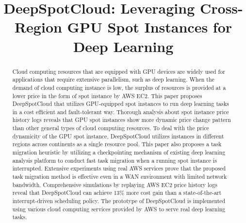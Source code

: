 \documentclass[conference]{IEEEtran}
\begin{document}

\title{DeepSpotCloud: Leveraging Cross-Region GPU Spot Instances for Deep Learning}


\author{
\and
{}
}

\maketitle

\begin{abstract}
Cloud computing resources that are equipped with GPU devices are widely used for applications that require extensive parallelism, such as deep learning. When the demand of cloud computing instance is low, the surplus of resources is provided at a lower price in the form of spot instance by AWS EC2. This paper proposes DeepSpotCloud that utilizes GPU-equipped spot instances to run deep learning tasks in a cost efficient and fault-tolerant way. Thorough analysis about spot instance price history logs reveals that GPU spot instances show more dynamic price change pattern than other general types of cloud computing resources. To deal with the price dynamicity of the GPU spot instance, DeepSpotCloud utilizes instances in different regions across continents as a single resource pool. This paper also proposes a task migration heuristic by utilizing a checkpointing mechanism of existing deep learning analysis platform to conduct fast task migration when a running spot instance is interrupted. Extensive experiments using real AWS services prove that the proposed task migration method is effective even in a WAN environment with limited network bandwidth. Comprehensive simulations by replaying AWS EC2 price history logs reveal that DeepSpotCloud can achieve 13\% more cost gain than a state-of-the-art interrupt-driven scheduling policy. The prototype of DeepSpotCloud is implemented using various cloud computing services provided by AWS to serve real deep learning tasks. 
\end{abstract}
\end{document}
